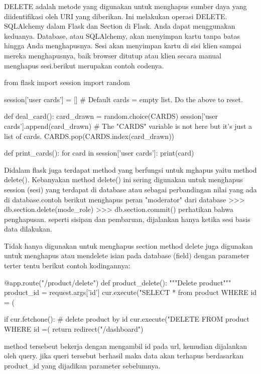 DELETE adalah metode yang digunakan untuk menghapus sumber daya yang diidentifikasi oleh URI yang diberikan. Ini melakukan operasi DELETE\cite{alemu2014rest}.
SQLAlchemy dalam Flask dan Section di Flask. Anda dapat menggunakan keduanya. Database, atau SQLAlchemy, akan menyimpan kartu tanpa batas hingga Anda menghapusnya. Sesi akan menyimpan kartu di sisi klien sampai mereka menghapusnya, baik browser ditutup atau klien secara manual menghapus sesi.berikut merupakan contoh codenya.

from flask import session
import random

session['user cards'] = []
# Default cards = empty list. Do the above to reset.

def deal_card():
  card_drawn = random.choice(CARDS)
  session['user cards'].append(card_drawn)
  # The "CARDS" variable is not here but it's just a list of cards.
  CARDS.pop(CARDS.index(card_drawn))

def print_cards():
  for card in session['user cards']:
    print(card)

Didalam flask juga terdapat method yang berfungsi untuk mghapus yaitu method delete(). Kebanyakan method delete() ini sering digunakan untuk menghapus session (sesi) yang terdapat di database atau sebagai perbandingan nilai yang ada di database.contoh berikut menghapus peran "moderator" dari database
>>> db.section.delete(mode_role)
>>> db.section.commit()
perhatikan bahwa penghapusan. seperti sisipan dan pembaruan, dijalankan hanya ketika sesi basis data dilakukan\cite{grinberg2018flask}.

Tidak hanya digunakan untuk menghapus section method delete juga digunakan untuk menghapus atau mendelete isian pada 
database (field) dengan parameter terter tentu berikut contoh kodingannya:

@app.route("/product/delete")
def product_delete():
    """Delete product"""
    product_id = request.args['id']
    cur.execute("SELECT * from product WHERE id = (%

    if cur.fetchone():
        # delete product by id
        cur.execute("DELETE FROM product WHERE id =(%
    return redirect("/dashboard")

method tersebeut bekerja dengan mengambil id pada url, kemudian dijalankan oleh query. jika queri tersebut berhasil maka
data akan terhapus berdasarkan product_id yang dijadikan parameter sebelumnya.

